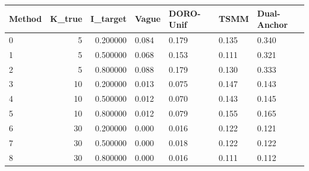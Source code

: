 \begin{tabular}{lrrllll}
\toprule
Method & K_true & I_target & Vague & DORO-Unif & TSMM & Dual-Anchor \\
\midrule
0 & 5 & 0.200000 & 0.084 & 0.179 & 0.135 & 0.340 \\
1 & 5 & 0.500000 & 0.068 & 0.153 & 0.111 & 0.321 \\
2 & 5 & 0.800000 & 0.088 & 0.179 & 0.130 & 0.333 \\
3 & 10 & 0.200000 & 0.013 & 0.075 & 0.147 & 0.143 \\
4 & 10 & 0.500000 & 0.012 & 0.070 & 0.143 & 0.145 \\
5 & 10 & 0.800000 & 0.012 & 0.079 & 0.155 & 0.165 \\
6 & 30 & 0.200000 & 0.000 & 0.016 & 0.122 & 0.121 \\
7 & 30 & 0.500000 & 0.000 & 0.018 & 0.122 & 0.122 \\
8 & 30 & 0.800000 & 0.000 & 0.016 & 0.111 & 0.112 \\
\bottomrule
\end{tabular}


